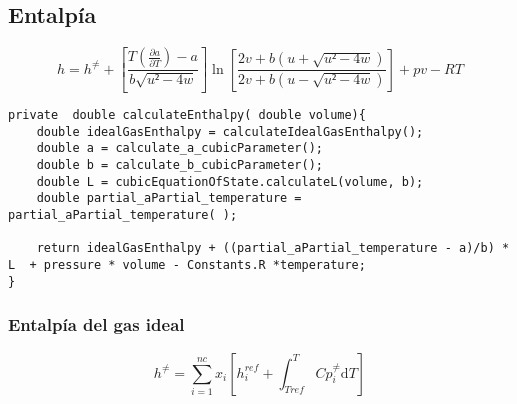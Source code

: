 \subsection{Entalpía}

\begin{equation}
h = h^{\neq} + \left[ \frac{T(\frac{\partial a}{\partial T}) - a}{b\sqrt{u²-4w} }\right] 
\ln\left[\frac{2v+b\left(u + \sqrt{u²-4w}\right)}{2v+b\left(u - \sqrt{u²-4w}\right)}\right]
+ pv - RT
\end{equation}

\begin{lstlisting}[label=some-code,caption=Some Code]
private  double calculateEnthalpy( double volume){
    double idealGasEnthalpy = calculateIdealGasEnthalpy();
    double a = calculate_a_cubicParameter();
    double b = calculate_b_cubicParameter();
    double L = cubicEquationOfState.calculateL(volume, b);
    double partial_aPartial_temperature = partial_aPartial_temperature( );
    
    return idealGasEnthalpy + ((partial_aPartial_temperature - a)/b) * L  + pressure * volume - Constants.R *temperature;
}
\end{lstlisting}	


\subsubsection{Entalpía del gas ideal}
\begin{equation}
h^{\neq} = \sum_{i=1}^{nc} x_i \left[ h_i^{ref} + \int_{Tref}^{T} Cp_i^{\neq} \mathrm{d}T \right]
\end{equation}




